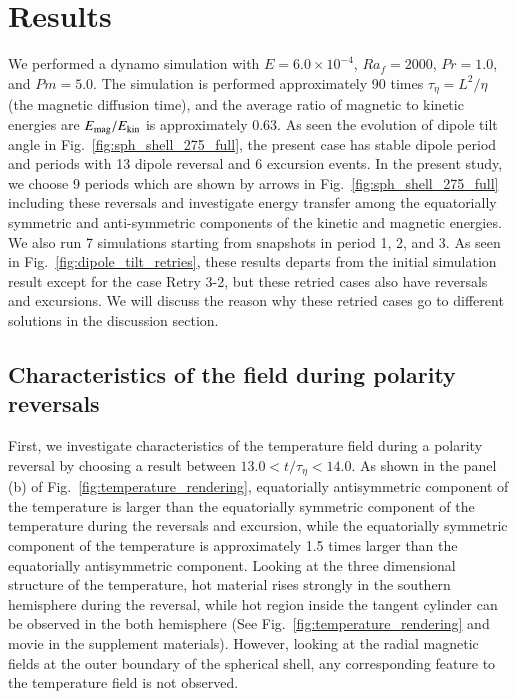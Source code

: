 \section{Results}
\label{section:results}

We performed a dynamo simulation with $E = 6.0 \times 10^{-4}$, $Ra_f = 2000$, $Pr = 1.0$, and $Pm = 5.0$. 
The simulation is performed approximately 90 times %
{\color{red}
$\tau_{\eta} = L^{2}/ \eta$ (the magnetic diffusion time), 
}
and the average ratio of magnetic to kinetic energies are $E_{\rm mag} / E_{\rm kin}$ is approximately 0.63. 
As seen the evolution of dipole tilt angle in Fig.~\ref{fig:sph_shell_275_full}, the present case has stable dipole period and periods with 13 dipole reversal and 6 excursion events. 
In the present study, we choose 9 periods which are shown by arrows in Fig.~\ref{fig:sph_shell_275_full} including these reversals and investigate energy transfer among the equatorially symmetric and anti-symmetric components of the kinetic and magnetic energies. 
We also run 7 simulations  starting from snapshots in period 1, 2, and 3. 
As seen in Fig.~\ref{fig:dipole_tilt_retries}, these results departs from the initial simulation result except for the case Retry 3-2, but these retried cases also have reversals and excursions. 
We will discuss the reason why these retried cases go to different solutions in the discussion section.

\subsection{Characteristics of the field during polarity reversals}

First, we investigate characteristics of the temperature field during a polarity reversal by choosing a result between $13.0 < t/\tau_{\eta} < 14.0$. 
As shown in the panel (b) of Fig.~\ref{fig:temperature_rendering}, equatorially antisymmetric component of the temperature is larger than the equatorially symmetric component of the temperature during the reversals and excursion, while the equatorially symmetric component of the temperature is approximately 1.5 times larger than the equatorially antisymmetric component. 
Looking at the three dimensional structure of the temperature, hot material rises strongly in the southern hemisphere during the reversal, while hot region inside the tangent cylinder can be observed in the both hemisphere (See Fig.~\ref{fig:temperature_rendering} and movie in the supplement materials). 
However, looking at the radial magnetic fields at the outer boundary of the spherical shell, any corresponding feature to the temperature field is not observed.

